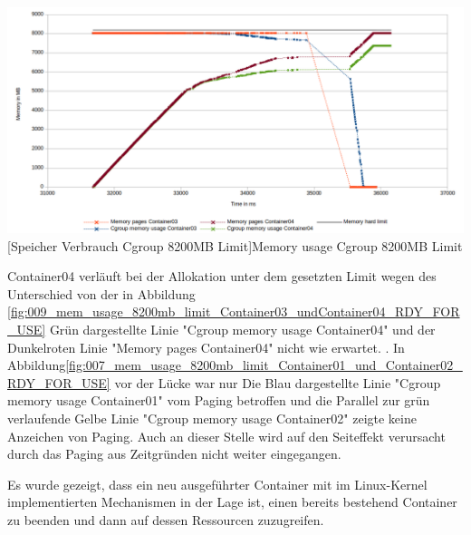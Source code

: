 \vspace{1em}
\begin{minipage}{\linewidth}
	\centering
	\includegraphics[width=1\linewidth]{pics/010_mem_usage_8200mb_limit_Container03_undContainer04_RDY_FOR_USE_Focus.png}
	[Speicher Verbrauch Cgroup 8200MB Limit]{Memory usage Cgroup 8200MB Limit}
	\label{fig:010_mem_usage_8200mb_limit_Container03_undContainer04_RDY_FOR_USE_Focu}
\end{minipage}

Container04 verläuft bei der Allokation unter dem gesetzten Limit wegen des Unterschied von der in Abbildung \ref{fig:009_mem_usage_8200mb_limit_Container03_undContainer04_RDY_FOR_USE} Grün dargestellte Linie "Cgroup memory usage Container04" und der Dunkelroten Linie "Memory pages Container04" nicht wie erwartet. . In Abbildung\ref{fig:007_mem_usage_8200mb_limit_Container01_und_Container02_RDY_FOR_USE} vor der Lücke war nur Die Blau dargestellte Linie "Cgroup memory usage Container01" vom Paging betroffen und die Parallel zur grün verlaufende Gelbe Linie "Cgroup memory usage Container02" zeigte keine Anzeichen von Paging. Auch an dieser Stelle wird auf den Seiteffekt verursacht durch das Paging aus Zeitgründen nicht weiter eingegangen.

Es wurde gezeigt, dass ein neu ausgeführter Container mit im Linux-Kernel implementierten Mechanismen in der Lage ist, einen bereits bestehend Container zu beenden und dann auf dessen Ressourcen zuzugreifen.



\pagebreak 
